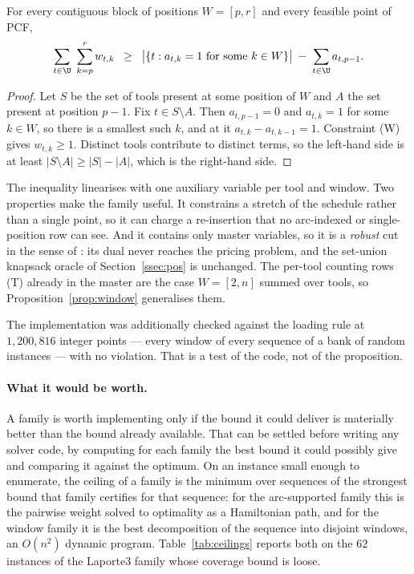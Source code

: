 \begin{proposition}\label{prop:window}
For every contiguous block of positions $W=[p,r]$ and every feasible point of PCF,
\begin{equation}\label{eq:window}
  \sum_{t\in\U}\ \sum_{k=p}^{r} w_{t,k}
  \;\;\ge\;\;
  \bigl\lvert\{t: a_{t,k}=1 \text{ for some } k\in W\}\bigr\rvert
  \;-\; \sum_{t\in\U} a_{t,p-1}.
\end{equation}
\end{proposition}

\begin{proof}
Let $S$ be the set of tools present at some position of $W$ and $A$ the set present at
position $p-1$. Fix $t\in S\setminus A$. Then $a_{t,p-1}=0$ and $a_{t,k}=1$ for some
$k\in W$, so there is a smallest such $k$, and at it $a_{t,k}-a_{t,k-1}=1$. Constraint
(W) gives $w_{t,k}\ge1$. Distinct tools contribute to distinct terms, so the left-hand
side is at least $\lvert S\setminus A\rvert\ge\lvert S\rvert-\lvert A\rvert$, which is
the right-hand side.
\end{proof}

The inequality linearises with one auxiliary variable per tool and window. Two
properties make the family useful. It constrains a stretch of the schedule rather than
a single point, so it can charge a re-insertion that no arc-indexed or single-position
row can see. And it contains only master variables, so it is a \emph{robust} cut in the
sense of \citet{Poggi2011}: its dual never reaches the pricing problem, and the
set-union knapsack oracle of Section~\ref{ssec:pos} is unchanged. The per-tool counting
rows (T) already in the master are the case $W=[2,n]$ summed over tools, so
Proposition~\ref{prop:window} generalises them.

The implementation was additionally checked against the loading rule at $1{,}200{,}816$
integer points --- every window of every sequence of a bank of random instances --- with
no violation. That is a test of the code, not of the proposition.

\paragraph{What it would be worth.}
A family is worth implementing only if the bound it could deliver is materially better
than the bound already available. That can be settled before writing any solver code,
by computing for each family the best bound it could possibly give and comparing it
against the optimum. On an instance small enough to enumerate, the ceiling of a family
is the minimum over sequences of the strongest bound that family certifies for that
sequence: for the arc-supported family this is the pairwise weight solved to optimality
as a Hamiltonian path, and for the window family it is the best decomposition of the
sequence into disjoint windows, an $O(n^2)$ dynamic program.
Table~\ref{tab:ceilings} reports both on the $62$ instances of the Laporte3 family whose
coverage bound is loose.

